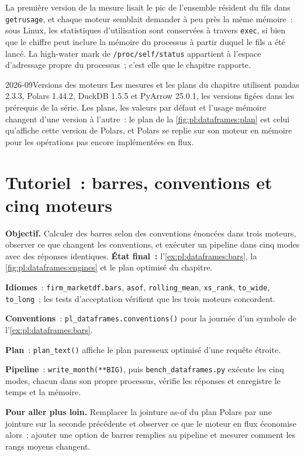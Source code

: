 \begin{remark}\label{rem:pl:dataframes:rss}
La première version de la mesure lisait le pic de l'ensemble résident du fils dans \texttt{getrusage}, et chaque moteur semblait demander à peu près
la même mémoire~: sous Linux, les statistiques d'utilisation sont conservées à travers \texttt{exec}, si bien que le chiffre peut inclure la mémoire du processus à partir duquel le fils a été
lancé. La high-water mark de
\texttt{/proc/self/status} appartient à l'espace d'adressage propre du processus~; c'est elle que le chapitre rapporte.
\end{remark}

\begin{dated}{2026-09}{Versions des moteurs}\label{dat:pl:dataframes:versions}
Les mesures et les plans du chapitre utilisent pandas 2.3.3, Polars 1.44.2, DuckDB 1.5.5 et PyArrow 25.0.1, les versions figées dans les
prérequis de la série. Les plans, les valeurs par défaut et l'usage mémoire changent d'une version à l'autre~: le plan de la \cref{fig:pl:dataframes:plan} est celui qu'affiche cette
version de Polars, et Polars se replie sur son moteur en mémoire pour les opérations pas encore implémentées en flux.
\end{dated}

\section{Tutoriel~: barres, conventions et cinq moteurs}\label{tut:pl:dataframes:tut}

\begin{tutorial}
\textbf{Objectif.} Calculer des barres selon des conventions énoncées dans trois moteurs, observer ce que changent les conventions, et exécuter un pipeline dans cinq
modes avec des réponses identiques. \textbf{État final~:} l'\cref{ex:pl:dataframes:bars}, la \cref{fig:pl:dataframes:engines} et le plan optimisé
du chapitre.
\begin{tutsteps}
\item \textbf{Idiomes}~: \texttt{firm\_marketdf.bars}, \texttt{asof}, \texttt{rolling\_mean}, \texttt{xs\_rank}, \texttt{to\_wide},
\texttt{to\_long}~; les tests d'acceptation vérifient que les trois moteurs concordent.
\item \textbf{Conventions}~: \texttt{pl\_dataframes.conventions()} pour la journée d'un symbole de l'\cref{ex:pl:dataframes:bars}.
\item \textbf{Plan}~: \texttt{plan\_text()} affiche le plan paresseux optimisé d'une requête étroite.
\item \textbf{Pipeline}~: \texttt{write\_month(**BIG)}, puis \texttt{bench\_dataframes.py} exécute les cinq modes, chacun dans son propre processus,
vérifie les réponses et enregistre le temps et la mémoire.
\end{tutsteps}
\textbf{Pour aller plus loin.} Remplacer la jointure as-of du plan Polars par une jointure sur la seconde précédente et observer ce que le moteur en flux
économise alors~; ajouter une option de barres remplies au pipeline et mesurer comment les rangs moyens changent.
\end{tutorial}

